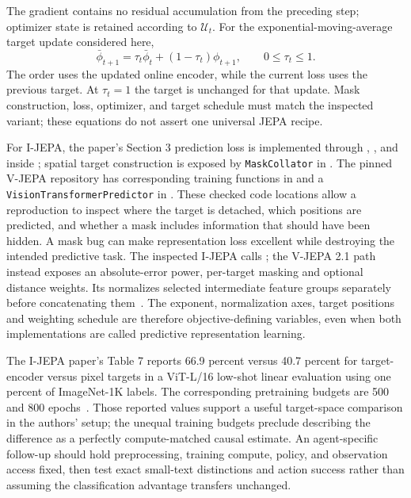 The gradient contains no residual accumulation from the preceding step; optimizer state is retained according to $\mathcal U_t$. For the exponential-moving-average target update considered here,
\begin{equation}
 \bar\phi_{t+1}=\tau_t\bar\phi_t+(1-\tau_t)\phi_{t+1},
 \qquad 0\leq\tau_t\leq1.
\label{eq:C05:targetmaintenance}
\end{equation}
The order uses the updated online encoder, while the current loss uses the previous target. At $\tau_t=1$ the target is unchanged for that update. Mask construction, loss, optimizer, and target schedule must match the inspected variant; these equations do not assert one universal JEPA recipe.

For I-JEPA, the paper's Section 3 prediction loss is implemented through , , and  inside ; spatial target construction is exposed by \texttt{MaskCollator} in . The pinned V-JEPA repository has corresponding training functions in  and a \texttt{VisionTransformerPredictor} in . These checked code locations allow a reproduction to inspect where the target is detached, which positions are predicted, and whether a mask includes information that should have been hidden. A mask bug can make representation loss excellent while destroying the intended predictive task. The inspected I-JEPA  calls ; the V-JEPA 2.1 path instead exposes an absolute-error power, per-target masking and optional distance weights. Its  normalizes selected intermediate feature groups separately before concatenating them~\cite{repo_ijepa,rewrite_vjepa2_repo}. The exponent, normalization axes, target positions and weighting schedule are therefore objective-defining variables, even when both implementations are called predictive representation learning.

The I-JEPA paper's Table 7 reports 66.9 percent versus 40.7 percent for target-encoder versus pixel targets in a ViT-L/16 low-shot linear evaluation using one percent of ImageNet-1K labels. The corresponding pretraining budgets are 500 and 800 epochs~\cite{assran2023ijepa}. Those reported values support a useful target-space comparison in the authors' setup; the unequal training budgets preclude describing the difference as a perfectly compute-matched causal estimate. An agent-specific follow-up should hold preprocessing, training compute, policy, and observation access fixed, then test exact small-text distinctions and action success rather than assuming the classification advantage transfers unchanged.

